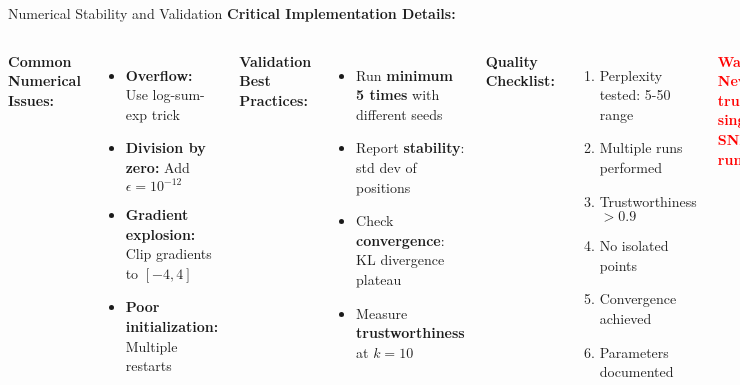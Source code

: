 \documentclass[aspectratio=169]{beamer}
\newcommand{\conceptbox}[2]{\colorbox{#1!20}{\textcolor{#1}{\textbf{#2}}}}
\newcommand{\warning}[1]{\conceptbox{red}{Warning: #1}}
\begin{document}
\begin{frame}{Numerical Stability and Validation}
\textbf{Critical Implementation Details:}

\begin{columns}
\textbf{Common Numerical Issues:}
\begin{itemize}
\item \textbf{Overflow:} Use log-sum-exp trick
\item \textbf{Division by zero:} Add $\epsilon = 10^{-12}$
\item \textbf{Gradient explosion:} Clip gradients to $[-4, 4]$
\item \textbf{Poor initialization:} Multiple restarts
\end{itemize}

\textbf{Validation Best Practices:}
\begin{itemize}
\item Run \textbf{minimum 5 times} with different seeds
\item Report \textbf{stability}: std dev of positions
\item Check \textbf{convergence}: KL divergence plateau
\item Measure \textbf{trustworthiness} at $k=10$
\end{itemize}

\textbf{Quality Checklist:}
\begin{enumerate}
\item[$\square$] Perplexity tested: 5-50 range
\item[$\square$] Multiple runs performed
\item[$\square$] Trustworthiness $> 0.9$
\item[$\square$] No isolated points
\item[$\square$] Convergence achieved
\item[$\square$] Parameters documented
\end{enumerate}

\warning{Never trust a single t-SNE run!}

\textbf{Reporting Requirements:}
\begin{itemize}
\item State exact parameters used
\item Include convergence plots
\item Show multiple perplexities
\item Provide code/random seeds
\end{itemize}
\end{columns}
\end{frame}
\end{document}
